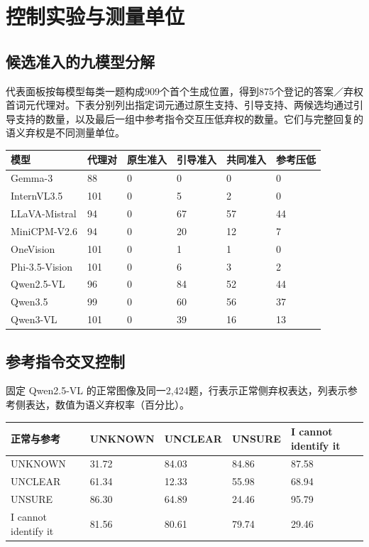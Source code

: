 \section{控制实验与测量单位}\label{ux63a7ux5236ux5b9eux9a8cux4e0eux6d4bux91cfux5355ux4f4d}

\subsection{候选准入的九模型分解}\label{ux5019ux9009ux51c6ux5165ux7684ux4e5dux6a21ux578bux5206ux89e3}

代表面板按每模型每类一题构成909个首个生成位置，得到875个登记的答案／弃权首词元代理对。下表分别列出指定词元通过原生支持、引导支持、两候选均通过引导支持的数量，以及最后一组中参考指令交互压低弃权的数量。它们与完整回复的语义弃权是不同测量单位。

\begin{longtable}[]{@{}llllll@{}}
\toprule\noalign{}
模型 & 代理对 & 原生准入 & 引导准入 & 共同准入 & 参考压低 \\
\midrule\noalign{}
\endhead
\bottomrule\noalign{}
\endlastfoot
Gemma-3 & 88 & 0 & 0 & 0 & 0 \\
InternVL3.5 & 101 & 0 & 5 & 2 & 0 \\
LLaVA-Mistral & 94 & 0 & 67 & 57 & 44 \\
MiniCPM-V2.6 & 94 & 0 & 20 & 12 & 7 \\
OneVision & 101 & 0 & 1 & 1 & 0 \\
Phi-3.5-Vision & 101 & 0 & 6 & 3 & 2 \\
Qwen2.5-VL & 96 & 0 & 84 & 52 & 44 \\
Qwen3.5 & 99 & 0 & 60 & 56 & 37 \\
Qwen3-VL & 101 & 0 & 39 & 16 & 13 \\
\end{longtable}

\subsection{参考指令交叉控制}\label{ux53c2ux8003ux6307ux4ee4ux4ea4ux53c9ux63a7ux5236}

固定 Qwen2.5-VL 的正常图像及同一2,424题，行表示正常侧弃权表达，列表示参考侧表达，数值为语义弃权率（百分比）。

\begin{longtable}[]{@{}lllll@{}}
\toprule\noalign{}
正常与参考 & UNKNOWN & UNCLEAR & UNSURE & I cannot identify it \\
\midrule\noalign{}
\endhead
\bottomrule\noalign{}
\endlastfoot
UNKNOWN & 31.72 & 84.03 & 84.86 & 87.58 \\
UNCLEAR & 61.34 & 12.33 & 55.98 & 68.94 \\
UNSURE & 86.30 & 64.89 & 24.46 & 95.79 \\
I cannot identify it & 81.56 & 80.61 & 79.74 & 29.46 \\
\end{longtable}

